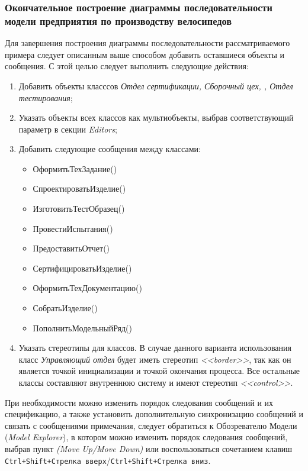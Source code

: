 \documentclass[a4paper,12pt]{extreport}
\begin{document}
\subsubsection*{Окончательное построение диаграммы последовательности модели предприятия по производству велосипедов}
Для завершения построения диаграммы последовательности рассматриваемого примера следует описанным выше способом добавить оставшиеся объекты и сообщения. С этой целью следует выполнить следующие действия:
\begin{enumerate}
	\item Добавить объекты класссов \textit{Отдел сертификации, Сборочный цех, , Отдел тестирования};
	\item Указать объекты всех классов как мультиобъекты, выбрав соответствующий параметр в секции \textit{Editors};
	\item Добавить следующие сообщения между классами:
	\begin{itemize}
		\item ОформитьТехЗадание() 
		\item СпроектироватьИзделие()
		\item ИзготовитьТестОбразец()
		\item ПровестиИспытания()
		\item ПредоставитьОтчет()
		\item СертифицироватьИзделие()
		\item ОформитьТехДокументацию()
		\item СобратьИзделие()
		\item ПополнитьМодельныйРяд()
	\end{itemize}
	\item Указать стереотипы для классов. В случае данного варианта использования класс \textit{Управляющий отдел} будет иметь стереотип \textit{<<border>>}, так как он является точкой инициализации и точкой окончания процесса. Все остальные классы составляют внутреннюю систему и имеют стереотип \textit{<<control>>}.
\end{enumerate}

При необходимости можно изменить порядок следования сообщений и их спецификацию, а также установить дополнительную синхронизацию сообщений и связать с сообщениями примечания, следует обратиться к Обозревателю Модели (\textit{Model Explorer}), в котором можно изменить порядок следования сообщений, выбрав пункт \textit{(Move Up/Move Down)} или воспользоваться сочетанием клавиш \texttt{Ctrl+Shift+Стрелка вверх}/\texttt{Ctrl+Shift+Стрелка вниз}.
\end{document}
